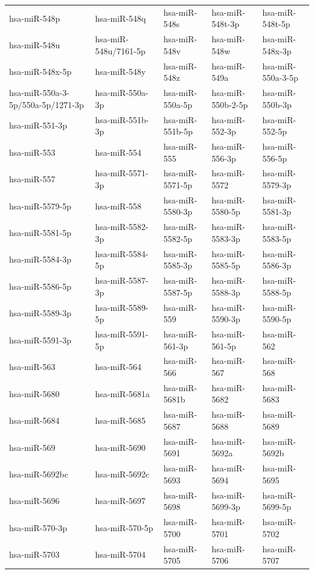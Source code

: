 \begin{longtable}{lllll}
hsa-miR-548p & hsa-miR-548q & hsa-miR-548s & hsa-miR-548t-3p & hsa-miR-548t-5p \\
hsa-miR-548u & hsa-miR-548u/7161-5p & hsa-miR-548v & hsa-miR-548w & hsa-miR-548x-3p \\
hsa-miR-548x-5p & hsa-miR-548y & hsa-miR-548z & hsa-miR-549a & hsa-miR-550a-3-5p \\
hsa-miR-550a-3-5p/550a-5p/1271-3p & hsa-miR-550a-3p & hsa-miR-550a-5p & hsa-miR-550b-2-5p & hsa-miR-550b-3p \\
hsa-miR-551-3p & hsa-miR-551b-3p & hsa-miR-551b-5p & hsa-miR-552-3p & hsa-miR-552-5p \\
hsa-miR-553 & hsa-miR-554 & hsa-miR-555 & hsa-miR-556-3p & hsa-miR-556-5p \\
hsa-miR-557 & hsa-miR-5571-3p & hsa-miR-5571-5p & hsa-miR-5572 & hsa-miR-5579-3p \\
hsa-miR-5579-5p & hsa-miR-558 & hsa-miR-5580-3p & hsa-miR-5580-5p & hsa-miR-5581-3p \\
hsa-miR-5581-5p & hsa-miR-5582-3p & hsa-miR-5582-5p & hsa-miR-5583-3p & hsa-miR-5583-5p \\
hsa-miR-5584-3p & hsa-miR-5584-5p & hsa-miR-5585-3p & hsa-miR-5585-5p & hsa-miR-5586-3p \\
hsa-miR-5586-5p & hsa-miR-5587-3p & hsa-miR-5587-5p & hsa-miR-5588-3p & hsa-miR-5588-5p \\
hsa-miR-5589-3p & hsa-miR-5589-5p & hsa-miR-559 & hsa-miR-5590-3p & hsa-miR-5590-5p \\
hsa-miR-5591-3p & hsa-miR-5591-5p & hsa-miR-561-3p & hsa-miR-561-5p & hsa-miR-562 \\
hsa-miR-563 & hsa-miR-564 & hsa-miR-566 & hsa-miR-567 & hsa-miR-568 \\
hsa-miR-5680 & hsa-miR-5681a & hsa-miR-5681b & hsa-miR-5682 & hsa-miR-5683 \\
hsa-miR-5684 & hsa-miR-5685 & hsa-miR-5687 & hsa-miR-5688 & hsa-miR-5689 \\
hsa-miR-569 & hsa-miR-5690 & hsa-miR-5691 & hsa-miR-5692a & hsa-miR-5692b \\
hsa-miR-5692bc & hsa-miR-5692c & hsa-miR-5693 & hsa-miR-5694 & hsa-miR-5695 \\
hsa-miR-5696 & hsa-miR-5697 & hsa-miR-5698 & hsa-miR-5699-3p & hsa-miR-5699-5p \\
hsa-miR-570-3p & hsa-miR-570-5p & hsa-miR-5700 & hsa-miR-5701 & hsa-miR-5702 \\
hsa-miR-5703 & hsa-miR-5704 & hsa-miR-5705 & hsa-miR-5706 & hsa-miR-5707 \\

\end{longtable}
